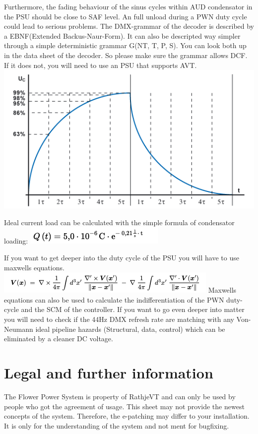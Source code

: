 \documentclass[10pt]{datasheet}
\begin{document}
Furthermore, the fading behaviour of the sinus cycles within AUD condensator in the PSU should be close to SAF level. An full unload during a PWN duty cycle could lead to serious problems.
The DMX-grammar of the decoder is described by a EBNF(Extended Backus-Naur-Form). It can also be descripted way simpler through a simple deterministic grammar G(NT, T, P, S). You can look both up 
in the data sheet of the decoder. So please make sure the grammar allows DCF. If it does not, you will need to use an PSU that supports AVT. 
\includegraphics[scale=0.5]{condensator.png}

Ideal current load can be calculated with the simple formula of condensator loading:
\includegraphics[scale=1]{formel.png}

If you want to get deeper into the duty cycle of the PSU you will have to use maxwells equations.
\includegraphics[scale=1]{komplexe formel.png}
Maxwells equations can also be used to calculate the indifferentiation of the PWN duty-cycle and the SCM of the controller. If you want to go even deeper into matter you will
need to check if the 44Hz DMX refresh rate are matching with any Von-Neumann ideal pipeline hazards (Structural, data, control) which can be eliminated by a cleaner DC voltage.


\section{Legal and further information}
 
The Flower Power System is property of RathjeVT and can only be used by people who got the agreement of usage. 
This sheet may not provide the newest concepts of the system. Therefore, the e-patching may differ to your installation.
It is only for the understanding of the system and not ment for bugfixing. 
\end{document}
